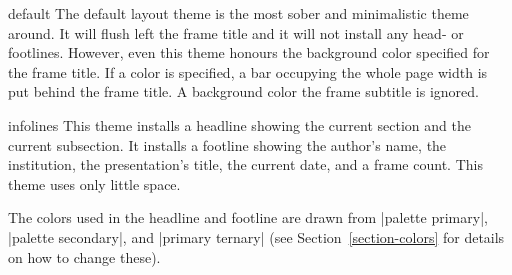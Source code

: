 \begin{layoutthemeexample}{default}
  The default layout theme is the most sober and minimalistic theme
  around. It will flush left the frame title and it will not install
  any head- or footlines. However, even this theme honours the
  background color specified for the frame title. If a color is
  specified, a bar occupying the whole page width is put behind the
  frame title. A background color the frame subtitle is ignored.
\end{layoutthemeexample}

\begin{layoutthemeexample}{infolines}
  This theme installs a headline showing the current section and the
  current subsection. It installs a footline showing the author's
  name, the institution, the presentation's title, the current date,
  and a frame count. This theme uses only little space.

  The colors used in the headline and footline are drawn from
  |palette primary|, |palette secondary|, and |primary ternary| (see
  Section~\ref{section-colors} for details on how to change these).
\end{layoutthemeexample}

